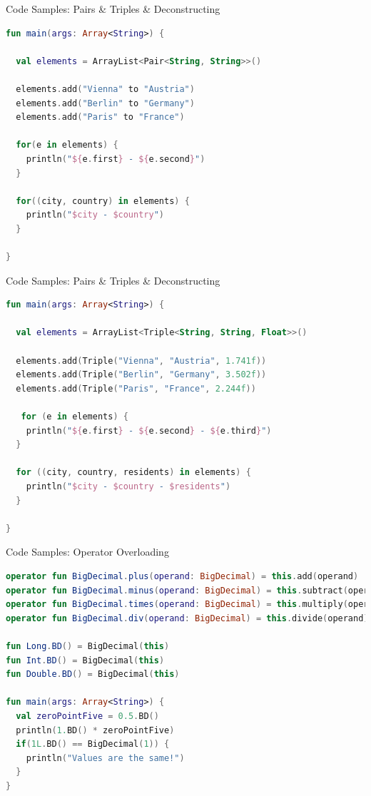 \begin{frame}[fragile]{Code Samples: Pairs \& Triples \& Deconstructing}
\begin{lstlisting}[language=Kotlin,basicstyle=\ttfamily\scriptsize]
fun main(args: Array<String>) {

  val elements = ArrayList<Pair<String, String>>()

  elements.add("Vienna" to "Austria")
  elements.add("Berlin" to "Germany")
  elements.add("Paris" to "France")

  for(e in elements) {
    println("${e.first} - ${e.second}")
  }

  for((city, country) in elements) {
    println("$city - $country")
  }

}
\end{lstlisting}
\end{frame}

\begin{frame}[fragile]{Code Samples: Pairs \& Triples \& Deconstructing}
\begin{lstlisting}[language=Kotlin,basicstyle=\ttfamily\scriptsize]
fun main(args: Array<String>) {

  val elements = ArrayList<Triple<String, String, Float>>()

  elements.add(Triple("Vienna", "Austria", 1.741f))
  elements.add(Triple("Berlin", "Germany", 3.502f))
  elements.add(Triple("Paris", "France", 2.244f))

   for (e in elements) {
    println("${e.first} - ${e.second} - ${e.third}")
  }

  for ((city, country, residents) in elements) {
    println("$city - $country - $residents")
  }

}
\end{lstlisting}
\end{frame}

\begin{frame}[fragile]{Code Samples: Operator Overloading}
\begin{lstlisting}[language=Kotlin,basicstyle=\ttfamily\scriptsize]
operator fun BigDecimal.plus(operand: BigDecimal) = this.add(operand)
operator fun BigDecimal.minus(operand: BigDecimal) = this.subtract(operand)
operator fun BigDecimal.times(operand: BigDecimal) = this.multiply(operand)
operator fun BigDecimal.div(operand: BigDecimal) = this.divide(operand)

fun Long.BD() = BigDecimal(this)
fun Int.BD() = BigDecimal(this)
fun Double.BD() = BigDecimal(this)

fun main(args: Array<String>) {
  val zeroPointFive = 0.5.BD()
  println(1.BD() * zeroPointFive)
  if(1L.BD() == BigDecimal(1)) {
    println("Values are the same!")
  }
}
\end{lstlisting}
\end{frame}

